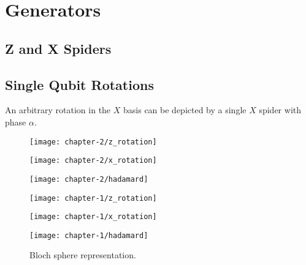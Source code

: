 \section{Generators}

\subsection{Z and X Spiders}

\subsection{Single Qubit Rotations}
An arbitrary rotation in the $X$ basis can be depicted by a single $X$ spider with phase $\alpha$.

\begin{figure}[H]
\centering
    \begin{minipage}{.3\textwidth}
      \centering
      \texttt{[image: chapter-2/z\_rotation]}
    \end{minipage}%
    \begin{minipage}{.3\textwidth}
      \centering
      \texttt{[image: chapter-2/x\_rotation]}
    \end{minipage}%
    \begin{minipage}{.3\textwidth}
      \centering
      \texttt{[image: chapter-2/hadamard]}
    \end{minipage}
    \begin{minipage}{.3\textwidth}
      \centering
      \texttt{[image: chapter-1/z\_rotation]}
    \end{minipage}
    \begin{minipage}{.3\textwidth}
      \centering
      \texttt{[image: chapter-1/x\_rotation]}
    \end{minipage}
    \begin{minipage}{.3\textwidth}
      \centering
      \texttt{[image: chapter-1/hadamard]}
    \end{minipage}
    \caption{Bloch sphere representation.}
\end{figure}

